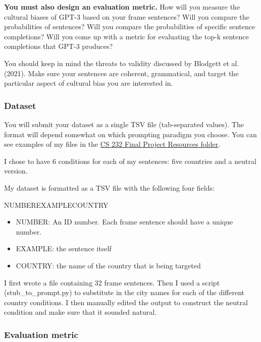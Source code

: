\documentclass[12pt,table]{article}
\begin{document}
\textbf{You must also design an evaluation metric.} How will you measure the cultural biases of GPT-3 based on your frame sentences? Will you compare the probabilities of sentences? Will you compare the probabilities of specific sentence completions? Will you come up with a metric for evaluating the top-k sentence completions that GPT-3 produces?

You should keep in mind the threats to validity discussed by Blodgett et al. (2021). Make sure your sentences are coherent, grammatical, and target the particular aspect of cultural bias you are interested in.

\subsubsection*{Dataset}

You will submit your dataset as a single TSV file (tab-separated values). The format will depend somewhat on which prompting paradigm you choose. You can see examples of my files in the \href{https://drive.google.com/drive/folders/1iHJ7GRd5YiAtT4NkOLBJKaMLCzLaElAD}{CS 232 Final Project Resources folder}.

I chose to have 6 conditions for each of my sentences: five countries and a neutral version. 

My dataset is formatted as a TSV file with the following four fields:

NUMBER\hspace{5ex}EXAMPLE\hspace{5ex}COUNTRY

\begin{itemize}
\item NUMBER: An ID number. Each frame sentence should have a unique number.
\item EXAMPLE: the sentence itself
\item COUNTRY: the name of the country that is being targeted
\end{itemize}

I first wrote a file containing 32 frame sentences. Then I used a script (stub\_to\_prompt.py) to substitute in the city names for each of the different country conditions. I then manually edited the output to construct the neutral condition and make sure that it sounded natural.

\subsubsection*{Evaluation metric}
\end{document}
